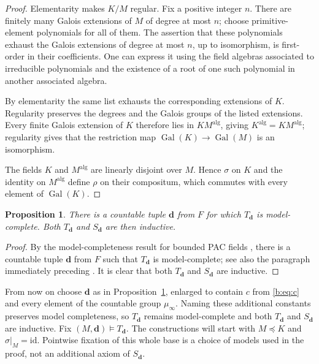 \documentclass[10pt,a4paper]{amsart}
\newtheorem{proposition}[theorem]{Proposition}
\theoremstyle{definition}
\newcommand{\alg}{\mathrm{alg}}
\newcommand{\bd}{\boldsymbol d}
\DeclareMathOperator{\Gal}{Gal}
\begin{document}
\begin{proof}
Elementarity makes $K/M$ regular. Fix a positive integer $n$. There
are finitely many Galois extensions of $M$ of degree at most $n$;
choose primitive-element polynomials for all of them. The assertion
that these polynomials exhaust the Galois extensions of degree at
most $n$, up to isomorphism, is first-order in their coefficients.
One can express it using the field algebras associated to irreducible
polynomials and the existence of a root of one such polynomial in
another associated algebra.

By elementarity the same list exhausts the corresponding extensions
of $K$. Regularity preserves the degrees and the Galois groups of
the listed extensions. Every finite Galois extension of $K$ therefore
lies in $KM^{\alg}$, giving $K^{\alg}=KM^{\alg}$; regularity gives that the restriction map $\Gal(K)\to \Gal(M)$ is an isomorphism.

The fields $K$ and $M^{\alg}$ are linearly disjoint over $M$. Hence
$\sigma$ on $K$ and the identity on $M^{\alg}$ define $\rho$ on their
compositum, which commutes with every element of $\Gal(K)$.
\end{proof}

\begin{proposition}\label{b:prop:constants}
There is a countable tuple $\bd$ from $F$ for which $T_{\bd}$ is
model-complete. Both $T_{\bd}$ and $S_{\bd}$ are then inductive.
\end{proposition}

\begin{proof}

By the model-completeness result for bounded PAC fields
\cite[Section~4.6]{CP}, there is a countable tuple $\bd$ from $F$
such that $T_{\bd}$ is model-complete; see also the paragraph
immediately preceding \cite[Theorem~4.10]{HK}.
It is clear that both $T_{\bd}$ and $S_{\bd}$ are inductive.
\end{proof}

From now on choose $\bd$ as in
Proposition~\ref{b:prop:constants}, enlarged to contain $c$ from
\eqref{b:eq:c} and every element of the countable group
$\mu_\infty$. Naming these additional constants preserves
model completeness, so $T_{\bd}$ remains model-complete and
both $T_{\bd}$ and $S_{\bd}$ are inductive.
Fix $(M,\bd)\models T_{\bd}$.
The constructions will start with $M\preccurlyeq K$ and
$\sigma|_M=\mathrm{id}$. Pointwise fixation of this whole base is a
choice of models used in the proof, not an additional axiom of $S_{\bd}$.
\end{document}

